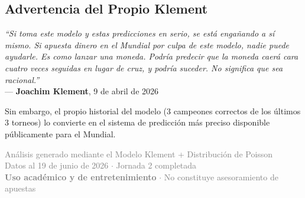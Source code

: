 \documentclass[11pt,a4paper]{article}
\begin{document}
\subsection{Advertencia del Propio Klement}

\begin{tcolorbox}[colback=red!5, colframe=red!60!black, arc=4pt]
\textit{``Si toma este modelo y estas predicciones en serio, se está engañando a sí mismo. 
Si apuesta dinero en el Mundial por culpa de este modelo, nadie puede ayudarle. 
Es como lanzar una moneda. Podría predecir que la moneda caerá cara cuatro veces 
seguidas en lugar de cruz, y podría suceder. No significa que sea racional.''} 
\\[4pt]
\hfill --- \textbf{Joachim Klement}, 9 de abril de 2026
\end{tcolorbox}

\vspace{0.3cm}
Sin embargo, el propio historial del modelo (3 campeones correctos de los últimos 3 
torneos) lo convierte en el sistema de predicción más preciso disponible públicamente 
para el Mundial.

\vfill
\begin{center}
\textcolor{gray}{\small 
Análisis generado mediante el Modelo Klement + Distribución de Poisson \\
Datos al 19 de junio de 2026 $\cdot$ Jornada 2 completada \\
\textbf{Uso académico y de entretenimiento} $\cdot$ No constituye asesoramiento de apuestas
}
\end{center}
\end{document}
